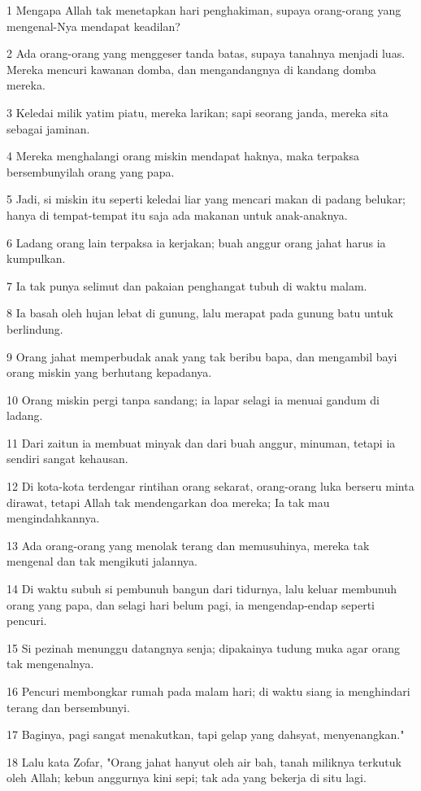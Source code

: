 \par 1 Mengapa Allah tak menetapkan hari penghakiman, supaya orang-orang yang mengenal-Nya mendapat keadilan?
\par 2 Ada orang-orang yang menggeser tanda batas, supaya tanahnya menjadi luas. Mereka mencuri kawanan domba, dan mengandangnya di kandang domba mereka.
\par 3 Keledai milik yatim piatu, mereka larikan; sapi seorang janda, mereka sita sebagai jaminan.
\par 4 Mereka menghalangi orang miskin mendapat haknya, maka terpaksa bersembunyilah orang yang papa.
\par 5 Jadi, si miskin itu seperti keledai liar yang mencari makan di padang belukar; hanya di tempat-tempat itu saja ada makanan untuk anak-anaknya.
\par 6 Ladang orang lain terpaksa ia kerjakan; buah anggur orang jahat harus ia kumpulkan.
\par 7 Ia tak punya selimut dan pakaian penghangat tubuh di waktu malam.
\par 8 Ia basah oleh hujan lebat di gunung, lalu merapat pada gunung batu untuk berlindung.
\par 9 Orang jahat memperbudak anak yang tak beribu bapa, dan mengambil bayi orang miskin yang berhutang kepadanya.
\par 10 Orang miskin pergi tanpa sandang; ia lapar selagi ia menuai gandum di ladang.
\par 11 Dari zaitun ia membuat minyak dan dari buah anggur, minuman, tetapi ia sendiri sangat kehausan.
\par 12 Di kota-kota terdengar rintihan orang sekarat, orang-orang luka berseru minta dirawat, tetapi Allah tak mendengarkan doa mereka; Ia tak mau mengindahkannya.
\par 13 Ada orang-orang yang menolak terang dan memusuhinya, mereka tak mengenal dan tak mengikuti jalannya.
\par 14 Di waktu subuh si pembunuh bangun dari tidurnya, lalu keluar membunuh orang yang papa, dan selagi hari belum pagi, ia mengendap-endap seperti pencuri.
\par 15 Si pezinah menunggu datangnya senja; dipakainya tudung muka agar orang tak mengenalnya.
\par 16 Pencuri membongkar rumah pada malam hari; di waktu siang ia menghindari terang dan bersembunyi.
\par 17 Baginya, pagi sangat menakutkan, tapi gelap yang dahsyat, menyenangkan."
\par 18 Lalu kata Zofar, "Orang jahat hanyut oleh air bah, tanah miliknya terkutuk oleh Allah; kebun anggurnya kini sepi; tak ada yang bekerja di situ lagi.
